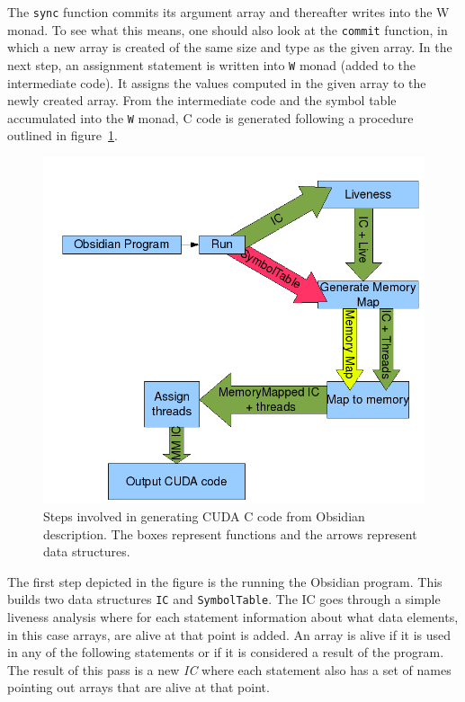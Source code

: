 The {\tt sync} function commits its argument array and 
thereafter writes \newline {\tt [Synchronize]} into the W monad. To see what 
this means, one should also look at the {\tt commit} function, in which
a new array is created of the same size and type 
as the given array. In the next step, an assignment statement is written into 
{\tt W} monad (added to the intermediate code). It
assigns the values computed in the given array to the newly created array.
From the intermediate code and the symbol table accumulated into the {\tt W} 
monad, C code is generated following a procedure outlined in 
figure~\ref{fig:code_gen}.
\begin{figure}%
\begin{center}
\includegraphics[scale=.3]{./ifl/stages2.png}
\caption{Steps involved in generating CUDA C code from Obsidian description.
The boxes represent functions and the arrows represent data structures.}
\label{fig:code_gen}
\end{center}
\end{figure}

The first step depicted in the figure is the running the Obsidian program. 
This builds two data structures {\tt IC} and {\tt SymbolTable}. 
The IC goes through a simple liveness analysis where for each statement
information about what data elements, in this case arrays,  are alive at 
that point is added. An array is alive if it is used in any of the following 
statements or if it is considered a result of the program. The result of this 
pass is a new {\em IC} where each statement also has a set of names pointing 
out arrays that are alive at that point. 


